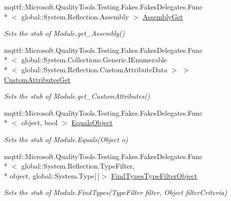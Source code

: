 \begin{DoxyCompactItemize}
\item 
mqttf\-::\-Microsoft.\-Quality\-Tools.\-Testing.\-Fakes.\-Fakes\-Delegates.\-Func\\*
$<$ global\-::\-System.\-Reflection.\-Assembly $>$ \hyperlink{class_system_1_1_reflection_1_1_fakes_1_1_stub_module_ab7ca7fcf91bdbd7c6e6fe0c81ea7d0e4}{Assembly\-Get}
\begin{DoxyCompactList}\small\item\em Sets the stub of Module.\-get\-\_\-\-Assembly()\end{DoxyCompactList}\item 
mqttf\-::\-Microsoft.\-Quality\-Tools.\-Testing.\-Fakes.\-Fakes\-Delegates.\-Func\\*
$<$ global\-::\-System.\-Collections.\-Generic.\-I\-Enumerable\\*
$<$ global\-::\-System.\-Reflection.\-Custom\-Attribute\-Data $>$ $>$ \hyperlink{class_system_1_1_reflection_1_1_fakes_1_1_stub_module_a391ce640f1148b0922b42e6b17fb3164}{Custom\-Attributes\-Get}
\begin{DoxyCompactList}\small\item\em Sets the stub of Module.\-get\-\_\-\-Custom\-Attributes()\end{DoxyCompactList}\item 
mqttf\-::\-Microsoft.\-Quality\-Tools.\-Testing.\-Fakes.\-Fakes\-Delegates.\-Func\\*
$<$ object, bool $>$ \hyperlink{class_system_1_1_reflection_1_1_fakes_1_1_stub_module_a0fe2a1d5f91555179675504009597c13}{Equals\-Object}
\begin{DoxyCompactList}\small\item\em Sets the stub of Module.\-Equals(\-Object o)\end{DoxyCompactList}\item 
mqttf\-::\-Microsoft.\-Quality\-Tools.\-Testing.\-Fakes.\-Fakes\-Delegates.\-Func\\*
$<$ global\-::\-System.\-Reflection.\-Type\-Filter, \\*
object, global\-::\-System.\-Type\mbox{[}$\,$\mbox{]}$>$ \hyperlink{class_system_1_1_reflection_1_1_fakes_1_1_stub_module_aa056315545ab221ba51e819d9c3ac3e8}{Find\-Types\-Type\-Filter\-Object}
\begin{DoxyCompactList}\small\item\em Sets the stub of Module.\-Find\-Types(\-Type\-Filter filter, Object filter\-Criteria)\end{DoxyCompactList}\item 

\end{DoxyCompactItemize}
